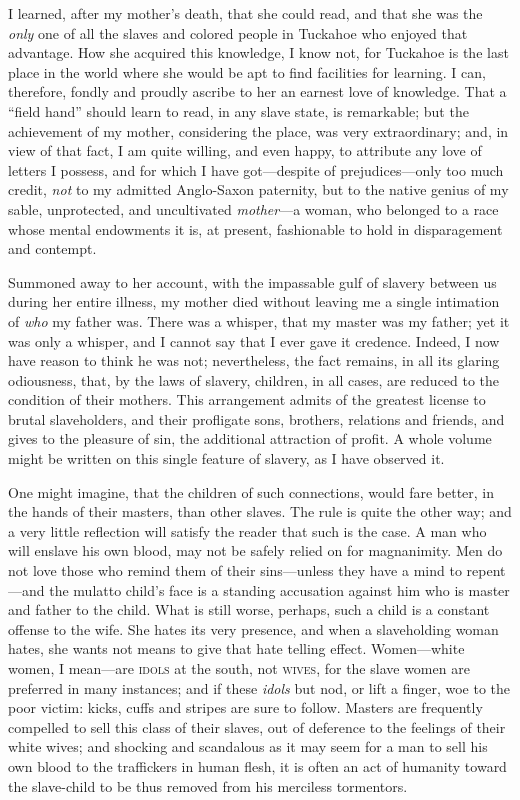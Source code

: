 I learned, after my mother's death, that she could
{\protect\hypertarget{58}{}{}}read, and that she was the \emph{only} one
of all the slaves and colored people in Tuckahoe who enjoyed that
advantage. How she acquired this knowledge, I know not, for Tuckahoe is
the last place in the world where she would be apt to find facilities
for learning. I can, therefore, fondly and proudly ascribe to her an
earnest love of knowledge. That a ``field hand'' should learn to read,
in any slave state, is remarkable; but the achievement of my mother,
considering the place, was very extraordinary; and, in view of that
fact, I am quite willing, and even happy, to attribute any love of
letters I possess, and for which I have got---despite of
prejudices---only too much credit, \emph{not} to my admitted Anglo-Saxon
paternity, but to the native genius of my sable, unprotected, and
uncultivated \emph{mother}---a woman, who belonged to a race whose
mental endowments it is, at present, fashionable to hold in
disparagement and contempt.

Summoned away to her account, with the impassable gulf of slavery
between us during her entire illness, my mother died without leaving me
a single intimation of \emph{who} my father was. There was a whisper,
that my master was my father; yet it was only a whisper, and I cannot
say that I ever gave it credence. Indeed, I now have reason to think he
was not; nevertheless, the fact remains, in all its glaring odiousness,
that, by the laws of slavery, children, in all cases, are reduced to the
condition of their mothers. This arrangement admits of the greatest
license to brutal slaveholders, and their profligate sons, brothers,
relations and friends, and gives to the pleasure of sin, the additional
attraction of profit. A whole volume might
{\protect\hypertarget{59}{}{}}be written on this single feature of
slavery, as I have observed it.

One might imagine, that the children of such connections, would fare
better, in the hands of their masters, than other slaves. The rule is
quite the other way; and a very little reflection will satisfy the
reader that such is the case. A man who will enslave his own blood, may
not be safely relied on for magnanimity. Men do not love those who
remind them of their sins---unless they have a mind to repent---and the
mulatto child's face is a standing accusation against him who is master
and father to the child. What is still worse, perhaps, such a child is a
constant offense to the wife. She hates its very presence, and when a
slaveholding woman hates, she wants not means to give that hate telling
effect. Women---white women, I mean---are \textsc{idols} at the south,
not \textsc{wives}, for the slave women are preferred in many instances;
and if these \emph{idols} but nod, or lift a finger, woe to the poor
victim: kicks, cuffs and stripes are sure to follow. Masters are
frequently compelled to sell this class of their slaves, out of
deference to the feelings of their white wives; and shocking and
scandalous as it may seem for a man to sell his own blood to the
traffickers in human flesh, it is often an act of humanity toward the
slave-child to be thus removed from his merciless tormentors.

